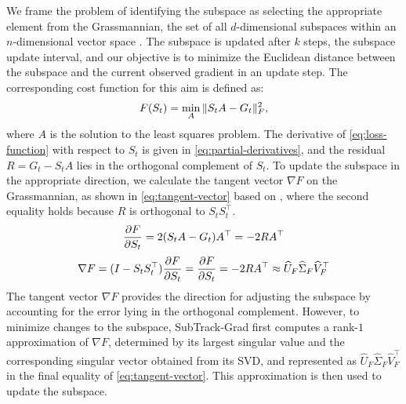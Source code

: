 We frame the problem of identifying the subspace as selecting the appropriate element from the Grassmannian, the set of all \(d\)-dimensional subspaces within an \(n\)-dimensional vector space \citep{Bendokat_2024}. The subspace is updated after \(k\) steps, the subspace update interval, and our objective is to minimize the Euclidean distance between the subspace and the current observed gradient in an update step. The corresponding cost function for this aim is defined as:
\begin{equation}\label{eq:loss-function}
\small
	F(S_t) = \min_{A} \|S_t A - G_t\|^2_F,
\end{equation}
where \(A\) is the solution to the least squares problem. The derivative of \eqref{eq:loss-function} with respect to \(S_t\) is given in \eqref{eq:partial-derivatives}, and the residual \(R = {G_t} - S_t A\) lies in the orthogonal complement of \(S_t\). To update the subspace in the appropriate direction, we calculate the tangent vector \( \nabla F \) on the Grassmannian, as shown in \eqref{eq:tangent-vector} based on \citet{edelman1998geometryalgorithmsorthogonalityconstraints}, where the second equality holds because \(R\) is orthogonal to \(S_t S_t^\top\).
\begin{equation}
\small
\frac{\partial F}{\partial S_t} = 2(S_t A - G_t) A^{\top} = -2R A^{\top}
\label{eq:partial-derivatives}
\end{equation}
\begin{equation}
\small
\nabla F = (I - S_tS_t^\top)\frac{\partial F}{\partial S_t} = \frac{\partial F}{\partial S_t} = -2R A^{\top} \approx \widehat{U}_F\widehat{\Sigma}_F\widehat{V}^\top_F
\label{eq:tangent-vector}
\end{equation}
The tangent vector \( \nabla F\) provides the direction for adjusting the subspace by accounting for the error lying in the orthogonal complement. However, to minimize changes to the subspace, SubTrack-Grad first computes a rank-\(1\) approximation of \( \nabla F \), determined by its largest singular value and the corresponding singular vector obtained from its SVD, and represented as \( \widehat{U}_F \widehat{\Sigma}_F \widehat{V}^\top_F \) in the final equality of \eqref{eq:tangent-vector}. This approximation is then used to update the subspace.

